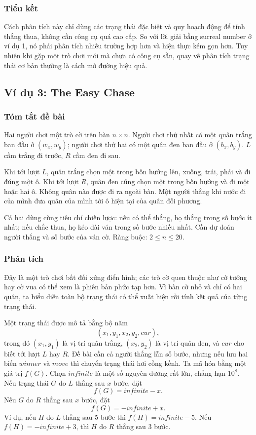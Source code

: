 \documentclass[11pt]{article}
\newcommand{\Inf}{\mathit{infinite}}
\begin{document}
\subsubsection*{Tiểu kết}

Cách phân tích này chỉ dùng các trạng thái đặc biệt và quy hoạch động để tính
thắng thua, không cần công cụ quá cao cấp. So với lời giải bằng surreal number
ở ví dụ 1, nó phải phân tích nhiều trường hợp hơn và hiện thực kém gọn hơn.
Tuy nhiên khi gặp một trò chơi mới mà chưa có công cụ sẵn, quay về phân tích
trạng thái cơ bản thường là cách mở đường hiệu quả.

\subsection{Ví dụ 3: The Easy Chase}

\subsubsection*{Tóm tắt đề bài}

Hai người chơi một trò cờ trên bàn \(n\times n\). Người chơi thứ nhất có một
quân trắng ban đầu ở \((w_x,w_y)\); người chơi thứ hai có một quân đen ban đầu
ở \((b_x,b_y)\). \(L\) cầm trắng đi trước, \(R\) cầm đen đi sau.

Khi tới lượt \(L\), quân trắng chọn một trong bốn hướng lên, xuống, trái, phải
và đi đúng một ô. Khi tới lượt \(R\), quân đen cũng chọn một trong bốn hướng
và đi một hoặc hai ô. Không quân nào được đi ra ngoài bàn. Một người thắng khi
nước đi của mình đưa quân của mình tới ô hiện tại của quân đối phương.

Cả hai dùng cùng tiêu chí chiến lược: nếu có thể thắng, họ thắng trong số bước
ít nhất; nếu chắc thua, họ kéo dài ván trong số bước nhiều nhất. Cần dự đoán
người thắng và số bước của ván cờ. Ràng buộc: \(2\le n\le 20\).

\subsubsection*{Phân tích}

Đây là một trò chơi bất đối xứng điển hình; các trò cờ quen thuộc như cờ
tướng hay cờ vua có thể xem là phiên bản phức tạp hơn. Vì bàn cờ nhỏ và chỉ
có hai quân, ta biểu diễn toàn bộ trạng thái có thể xuất hiện rồi tính kết quả
của từng trạng thái.

Một trạng thái được mô tả bằng bộ năm
\[
  (x_1,y_1,x_2,y_2,\mathit{cur}),
\]
trong đó \((x_1,y_1)\) là vị trí quân trắng, \((x_2,y_2)\) là vị trí quân đen,
và \(\mathit{cur}\) cho biết tới lượt \(L\) hay \(R\). Đề bài cần cả người
thắng lẫn số bước, nhưng nếu lưu hai biến \(\mathit{winner}\) và
\(\mathit{move}\) thì chuyển trạng thái hơi cồng kềnh. Ta mã hóa bằng một giá
trị \(f(G)\). Chọn \(\Inf\) là một số nguyên dương rất lớn, chẳng hạn
\(10^8\). Nếu trạng thái \(G\) do \(L\) thắng sau \(x\) bước, đặt
\[
  f(G)=\Inf-x.
\]
Nếu \(G\) do \(R\) thắng sau \(x\) bước, đặt
\[
  f(G)=-\Inf+x.
\]
Ví dụ, nếu \(H\) do \(L\) thắng sau \(5\) bước thì \(f(H)=\Inf-5\). Nếu
\(f(H)=-\Inf+3\), thì \(H\) do \(R\) thắng sau \(3\) bước.
\end{document}

